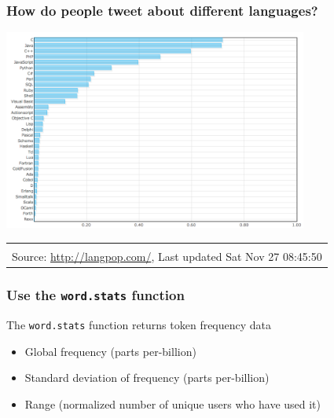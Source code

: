 \documentclass[xcolor=dvipsnames, 9pt]{beamer}
\begin{document}
\begin{frame}[fragile]
    \frametitle{How do people tweet about different languages?}
    \begin{center}
        \includegraphics[width=10cm]{images/lang_pop.png}
    \end{center}
    \begin{tabular}{r}
        \hline \\
        \scriptsize{Source: \url{http://langpop.com/},  Last updated Sat Nov 27 08:45:50}
    \end{tabular}
\end{frame}

\begin{frame}[fragile]
    \frametitle{Use the \texttt{word.stats} function}
    The \texttt{word.stats} function returns token frequency data
    \begin{itemize}
        \item Global frequency (parts per-billion)
        \item Standard deviation of frequency (parts per-billion)
        \item Range (normalized number of unique users who have used it)
    \end{itemize}
\end{frame}
\end{document}
